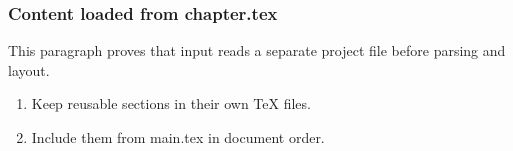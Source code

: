 \subsubsection{Content loaded from chapter.tex}
This paragraph proves that input reads a separate project file before parsing and layout.

\begin{enumerate}
\item Keep reusable sections in their own TeX files.
\item Include them from main.tex in document order.
\end{enumerate}
